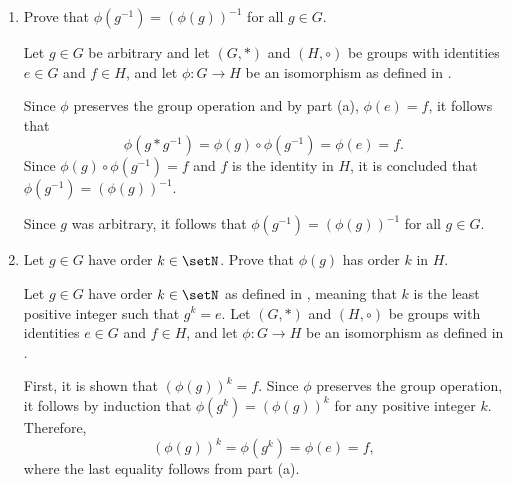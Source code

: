 \begin{enumerate}
\begin{enumerate}
\begin{subprove}
      Since $\phi$ is an isomorphism, it preserves the group operation, i.e., 
      $\phi(a * b) = \phi(a) \circ \phi(b)$ for all $a, b \in G$.
      
      For any $g \in G$, it is observed that $e * g = g$.
      Applying $\phi$ to both sides and using the property that $\phi$ preserves the group operation,
      \[
        \phi(e * g) = \phi(e) \circ \phi(g) = \phi(g).
      \]
      Since $\phi(g) \in H$ and $f$ is the identity in $H$, it follows that
      \[
        \phi(e) \circ \phi(g) = \phi(g) = f \circ \phi(g).
      \]
      By the cancellation property in $H$, it is concluded that $\phi(e) = f$.
    \end{subprove}
    \item Prove that $\phi\left(g^{-1}\right)=(\phi(g))^{-1}$ for all $g \in G$.
    \begin{subprove}
      Let $g \in G$ be arbitrary and let $(G, *)$ and $(H, \circ)$ be groups with identities $e \in G$ and $f \in H$, 
      and let $\phi: G \to H$ be an isomorphism as defined in .
      
      Since $\phi$ preserves the group operation and by part (a), $\phi(e) = f$,
      it follows that
      \[
        \phi(g * g^{-1}) = \phi(g) \circ \phi(g^{-1}) = \phi(e) = f.
      \]
      Since $\phi(g) \circ \phi(g^{-1}) = f$ and $f$ is the identity in $H$,
      it is concluded that $\phi(g^{-1}) = (\phi(g))^{-1}$.
      
      Since $g$ was arbitrary, it follows that $\phi(g^{-1}) = (\phi(g))^{-1}$ for all $g \in G$.
    \end{subprove}
    \item Let $g \in G$ have order $k \in \setN$. Prove that $\phi(g)$ has order $k$ in $H$.
    \begin{subprove}
      Let $g \in G$ have order $k \in \setN$ as defined in , 
      meaning that $k$ is the least positive integer such that $g^k = e$.
      Let $(G, *)$ and $(H, \circ)$ be groups with identities $e \in G$ and $f \in H$, 
      and let $\phi: G \to H$ be an isomorphism as defined in .
      
      First, it is shown that $(\phi(g))^k = f$.
      Since $\phi$ preserves the group operation, it follows by induction that 
      $\phi(g^k) = (\phi(g))^k$ for any positive integer $k$.
      Therefore,
      \[
        (\phi(g))^k = \phi(g^k) = \phi(e) = f,
      \]
      where the last equality follows from part (a).
      

\end{subprove}
\end{enumerate}
\end{enumerate}
